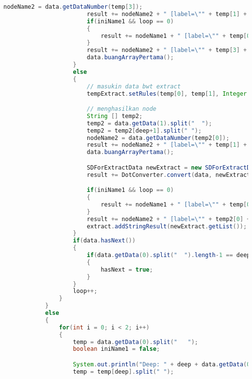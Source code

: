 \begin{lstlisting}[language=Java,basicstyle=\tiny,caption=DotConverter.java]
                        nodeName2 = data.getDataNumber(temp[3]);
                        result += nodeName2 + " [label=\"" + temp[1] + " " + temp[2].substring(0, temp[2].length()-1) +  "\"]\n";
                        if(iniName1 && loop == 0)
                        {
                            result += nodeName1 + " [label=\"" + temp[0] + "\",shape=box,style=filled,color=\"1.0 " + color + " 1.0\"]\n";
                        }
                        result += nodeName2 + " [label=\"" + temp[3] + "\"]\n";
                        data.buangArrayPertama();
                    }
                    else
                    {
                        // masukin data bwt extract
                        tempExtract.setRules(temp[0], temp[1], Integer.parseInt(temp[2]));

                        // menghasilkan node
                        String [] temp2;
                        temp2 = data.getData(1).split("  ");
                        temp2 = temp2[deep+1].split(" ");
                        nodeName2 = data.getDataNumber(temp2[0]);
                        result += nodeName2 + " [label=\"" + temp[1] + " " + temp[2] +  "\",shape=box,style=filled,color=\"1.0 " + color + " 1.0\"]\n";
                        data.buangArrayPertama();

                        SDForExtractData newExtract = new SDForExtractData(tempExtract);
                        result += DotConverter.convert(data, newExtract, miningAlgo, deep+1, nodeName2);

                        if(iniName1 && loop == 0)
                        {
                            result += nodeName1 + " [label=\"" + temp[0] + "\",shape=box,style=filled,color=\"1.0 " + color + " 1.0\"]\n";
                        }
                        result += nodeName2 + " [label=\"" + temp2[0] + "\",shape=box,style=filled,color=\"1.0 " + color + " 1.0\"]\n";
                        extract.addStringResult(newExtract.getList());
                    }
                    if(data.hasNext())
                    {
                        if(data.getData(0).split("  ").length-1 == deep)
                        {
                            hasNext = true;
                        }
                    }
                    loop++;
                }
            }
            else
            {
                for(int i = 0; i < 2; i++)
                {
                    temp = data.getData(0).split("   ");
                    boolean iniName1 = false;

                    System.out.println("Deep: " + deep + data.getData(0));
                    temp = temp[deep].split(" ");


\end{lstlisting}
